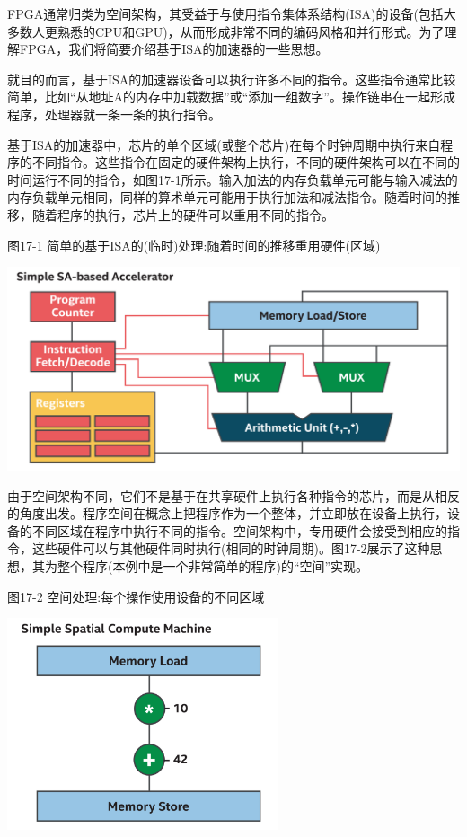 FPGA通常归类为空间架构，其受益于与使用指令集体系结构(ISA)的设备(包括大多数人更熟悉的CPU和GPU)，从而形成非常不同的编码风格和并行形式。为了理解FPGA，我们将简要介绍基于ISA的加速器的一些思想。\par

就目的而言，基于ISA的加速器设备可以执行许多不同的指令。这些指令通常比较简单，比如“从地址A的内存中加载数据”或“添加一组数字”。操作链串在一起形成程序，处理器就一条一条的执行指令。\par

基于ISA的加速器中，芯片的单个区域(或整个芯片)在每个时钟周期中执行来自程序的不同指令。这些指令在固定的硬件架构上执行，不同的硬件架构可以在不同的时间运行不同的指令，如图17-1所示。输入加法的内存负载单元可能与输入减法的内存负载单元相同，同样的算术单元可能用于执行加法和减法指令。随着时间的推移，随着程序的执行，芯片上的硬件可以重用不同的指令。\par

\hspace*{\fill} \par %
图17-1 简单的基于ISA的(临时)处理:随着时间的推移重用硬件(区域)
\begin{center}
	\includegraphics[width=1.0\textwidth]{content/chapter-17/images/2}
\end{center}

由于空间架构不同，它们不是基于在共享硬件上执行各种指令的芯片，而是从相反的角度出发。程序空间在概念上把程序作为一个整体，并立即放在设备上执行，设备的不同区域在程序中执行不同的指令。空间架构中，专用硬件会接受到相应的指令，这些硬件可以与其他硬件同时执行(相同的时钟周期)。图17-2展示了这种思想，其为整个程序(本例中是一个非常简单的程序)的“空间”实现。\par

\hspace*{\fill} \par %
图17-2 空间处理:每个操作使用设备的不同区域
\begin{center}
	\includegraphics[width=0.6\textwidth]{content/chapter-17/images/3}
\end{center}

